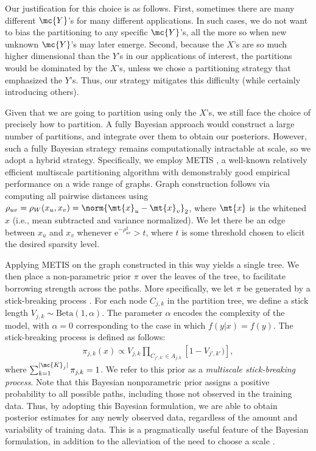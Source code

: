 	Our justification for this choice is as follows. First, sometimes there are many different $\mc{Y}$'s for many different applications.  In such cases, we do not want to bias the partitioning to any specific $\mc{Y}$'s, all the more so when new unknown $\mc{Y}$'s may later emerge.  Second, because the $X$'s are so much higher dimensional than the $Y$'s in our applications of interest, the partitions would be dominated by the $X$'s, unless we chose a partitioning strategy that emphasized the $Y$'s.  Thus, our strategy mitigates this difficulty (while certainly introducing others). 

	Given that we are going to partition using only the $X$'s, we still face the choice of precisely how to partition.  A fully Bayesian approach would construct a large number of partitions, and integrate over them to obtain our posteriors.  However, such a fully Bayesian strategy remains  computationally intractable at scale, so we adopt a hybrid strategy.  Specifically, we employ METIS \cite{METIS}, a well-known relatively efficient multiscale partitioning algorithm with demonstrably good empirical performance on a wide range of graphs.  Graph construction follows via computing all pairwise distances using $\rho_{uv}=\rho_W(x_u,x_v)=\norm{\mt{x}_u-\mt{x}_v}_2$, where $\mt{x}$ is the whitened $x$ (i.e., mean subtracted and variance normalized). We let there be an edge between $x_u$ and $x_v$ whenever  e$^{-\rho_{uv}^2} > t$, where $t$ is some threshold chosen to elicit the desired sparsity level.
	
	Applying METIS on the graph constructed in this way yields a single tree.  We then place a non-parametric prior $\pi$ over the leaves of the tree, to facilitate borrowing strength across the paths.  More specifically, we let $\pi$ be generated by a stick-breaking process \cite{stickbreaking}.  For each node $C_{j,k}$ in the partition tree, we define a stick length $V_{j,k} \sim \mbox{Beta}(1,\alpha)$.  The parameter $\alpha$ encodes the complexity of the model, with $\alpha=0$ corresponding to the case in which $f(y|x) = f(y)$. The stick-breaking process is defined as follows: 
	\begin{eqnarray*}
	\pi_{j,k}(x) \propto V_{j,k} \prod_{C_{j',k'} \in A_{j,k}} \left[1 - V_{j',k'}) \right],
	\end{eqnarray*}
	where  $\sum_{k=1}^{|\mc{K}_j|} \pi_{j,k} = 1$.   We refer to this prior as a {\em multiscale stick-breaking process}. Note that this Bayesian nonparametric prior assigns a positive probability to all possible paths, including those not observed in the training data.  Thus, by adopting this Bayesian formulation, we are able to obtain posterior estimates for any newly observed data, regardless of the amount and variability of training data.  This is a pragmatically useful feature of the Bayesian formulation, in addition to the alleviation of the need to choose a scale \cite{ChenMaggioni12}.  %


